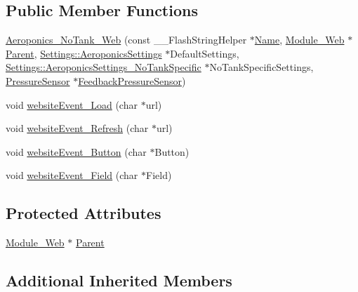 \subsection*{Public Member Functions}
\begin{DoxyCompactItemize}
\item 
\hyperlink{class_aeroponics___no_tank___web_a5808702849b83477f93202b05b170e2b}{Aeroponics\+\_\+\+No\+Tank\+\_\+\+Web} (const \+\_\+\+\_\+\+Flash\+String\+Helper $\ast$\hyperlink{class_common_aeea91a726dbe988e515057b32ba0726f}{Name}, \hyperlink{class_module___web}{Module\+\_\+\+Web} $\ast$\hyperlink{class_aeroponics___no_tank___web_a0d3231552931448e24b0a4839301932f}{Parent}, \hyperlink{struct_settings_1_1_aeroponics_settings}{Settings\+::\+Aeroponics\+Settings} $\ast$Default\+Settings, \hyperlink{struct_settings_1_1_aeroponics_settings___no_tank_specific}{Settings\+::\+Aeroponics\+Settings\+\_\+\+No\+Tank\+Specific} $\ast$No\+Tank\+Specific\+Settings, \hyperlink{class_pressure_sensor}{Pressure\+Sensor} $\ast$\hyperlink{class_aeroponics_ab5e9a2fe86a36e1e84876eb1366a2bfb}{Feedback\+Pressure\+Sensor})
\item 
void \hyperlink{class_aeroponics___no_tank___web_a59a1c123bc843197e74c16e8aac7daa2}{website\+Event\+\_\+\+Load} (char $\ast$url)
\item 
void \hyperlink{class_aeroponics___no_tank___web_a1248fe0a06097426645344b35aec0431}{website\+Event\+\_\+\+Refresh} (char $\ast$url)
\item 
void \hyperlink{class_aeroponics___no_tank___web_a33b388e724f870482f90106fdacaa3b4}{website\+Event\+\_\+\+Button} (char $\ast$Button)
\item 
void \hyperlink{class_aeroponics___no_tank___web_ad91ef49025ae421e26f39a5df527d95e}{website\+Event\+\_\+\+Field} (char $\ast$Field)
\end{DoxyCompactItemize}
\subsection*{Protected Attributes}
\begin{DoxyCompactItemize}
\item 
\hyperlink{class_module___web}{Module\+\_\+\+Web} $\ast$ \hyperlink{class_aeroponics___no_tank___web_a0d3231552931448e24b0a4839301932f}{Parent}
\end{DoxyCompactItemize}
\subsection*{Additional Inherited Members}



